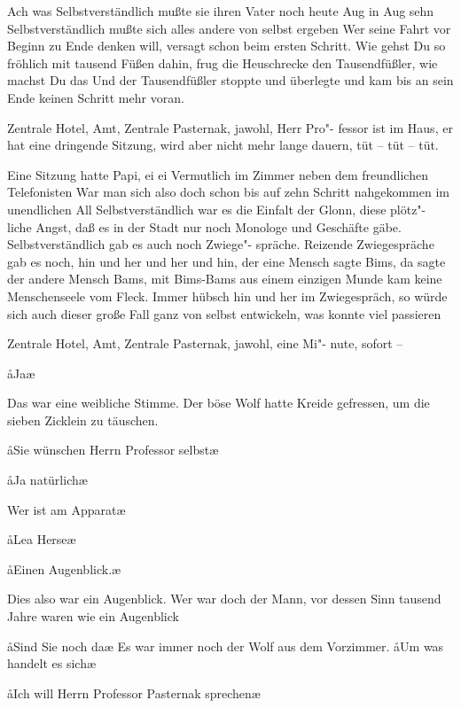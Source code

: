 Ach was\ausr{} Selbstverständlich mußte sie ihren Vater noch heute
Aug in Aug sehn\ausr{} Selbstverständlich mußte sich alles andere
von selbst ergeben\ausr{} Wer seine Fahrt vor Beginn zu Ende
denken will, versagt schon beim ersten Schritt. Wie gehst Du
so fröhlich mit tausend Füßen dahin, frug die Heuschrecke den
Tausendfüßler, wie machst Du das\frag{} Und der Tausendfüßler
stoppte und überlegte und kam bis an sein Ende keinen
Schritt mehr voran.

Zentrale Hotel, Amt, Zentrale Pasternak, jawohl, Herr Pro"-%
fessor ist im Haus, er hat eine dringende Sitzung, wird aber
nicht mehr lange dauern, tüt -- tüt -- tüt.

Eine Sitzung hatte Papi, ei ei\frag{} Vermutlich im Zimmer neben
dem freundlichen Telefonisten\frag{} War man sich also doch schon
bis auf zehn Schritt nahgekommen im unendlichen All\frag{}
Selbstverständlich war es die Einfalt der Glonn, diese plötz"-%
liche Angst, daß es in der Stadt nur noch Monologe und
Geschäfte gäbe. Selbstverständlich gab es auch noch Zwiege"-%
spräche. Reizende Zwiegespräche gab es noch, hin und her und
her und hin, der eine Mensch sagte Bims, da sagte der andere
Mensch Bams, mit Bims-Bams aus einem einzigen Munde
kam keine Menschenseele vom Fleck. Immer hübsch hin und
her im Zwiegespräch, so würde sich auch dieser große Fall
ganz von selbst entwickeln, was konnte viel passieren\ausr{}

Zentrale Hotel, Amt, Zentrale Pasternak, jawohl, eine Mi"-%
nute, sofort --

\aa{}Ja\frag{}\ae{}

Das war eine weibliche Stimme. Der böse Wolf hatte Kreide
gefressen, um die sieben Zicklein zu täuschen.

\aa{}Sie wünschen Herrn Professor selbst\frag{}\ae{}

\aa{}Ja natürlich\punkte{}\ae{}

\aanah{}Wer ist am Apparat\frag{}\ae{}

\aa{}Lea Herse\punkte{}\ae{}

\aa{}Einen Augenblick.\ae{}

Dies also war ein Augenblick. Wer war doch der Mann, vor
dessen Sinn tausend Jahre waren wie ein Augenblick\frag{}

\aa{}Sind Sie noch da\frag{}\ae{} Es war immer noch der Wolf aus dem
Vorzimmer. \aa{}Um was handelt es sich\frag{}\ae{}

\aa{}Ich will Herrn Professor Pasternak sprechen\punkte{}\ae{}


